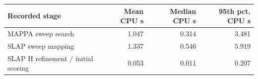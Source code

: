 \begin{tabular}{@{}lrrr@{}}\toprule
Recorded stage & Mean CPU s & Median CPU s & 95th pct. CPU s\\\midrule
MAPPA sweep search & 1.047 & 0.314 & 3.481\\
SLAP sweep mapping & 1.337 & 0.546 & 5.919\\
SLAP H refinement / initial scoring & 0.053 & 0.011 & 0.207\\
\bottomrule\end{tabular}
